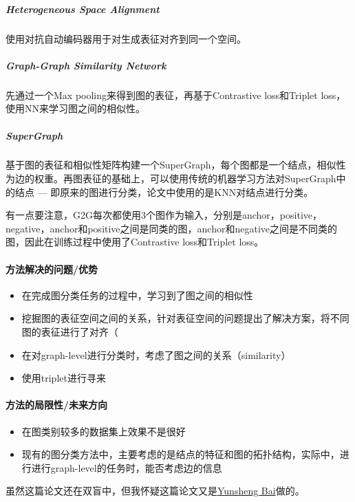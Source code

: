 \subparagraph{Heterogeneous Space Alignment}使用对抗自动编码器\cite{makhzani2016adversarial}用于对生成表征对齐到同一个空间。

\subparagraph{Graph-Graph Similarity Network}先通过一个Max pooling来得到图的表征，再基于Contrastive loss和Triplet loss，使用NN来学习图之间的相似性。

\subparagraph{SuperGraph}基于图的表征和相似性矩阵构建一个SuperGraph，每个图都是一个结点，相似性为边的权重。再图表征的基础上，可以使用传统的机器学习方法对SuperGraph中的结点 --- 即原来的图进行分类，论文中使用的是KNN对结点进行分类。
\newline

有一点要注意，G2G每次都使用3个图作为输入，分别是anchor，positive，negative，anchor和positive之间是同类的图，anchor和negative之间是不同类的图，因此在训练过程中使用了Contrastive loss和Triplet loss。

\paragraph{方法解决的问题/优势}
\begin{itemize}
	\item 在完成图分类任务的过程中，学习到了图之间的相似性
	\item 挖掘图的表征空间之间的关系，针对表征空间的问题提出了解决方案，将不同图的表征进行了对齐（
	\item 在对graph-level进行分类时，考虑了图之间的关系（similarity）
	\item 使用triplet进行寻来
\end{itemize}

\paragraph{方法的局限性/未来方向}
\begin{itemize}
	\item 在图类别较多的数据集上效果不是很好
	\item 现有的图分类方法中，主要考虑的是结点的特征和图的拓扑结构，实际中，进行进行graph-level的任务时，能否考虑边的信息

\end{itemize}
\newline

虽然这篇论文还在双盲中，但我怀疑这篇论文又是\href{http://yunshengb.com/}{Yunsheng Bai}做的。



